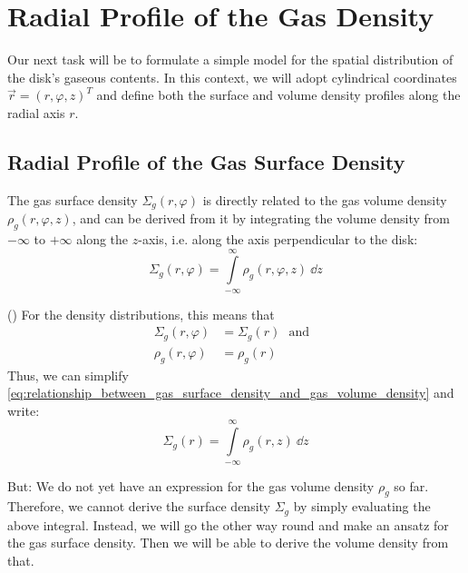 \clearpage\section{Radial Profile of the Gas Density}

    Our next task will be to formulate a simple model for the spatial distribution of the disk's 
    gaseous contents. In this context, we will adopt cylindrical coordinates 
    $\vec r=(r, \varphi, z)^T$ and define both the surface and volume density profiles along the 
    radial axis $r$.

    \subsection{Radial Profile of the Gas Surface Density}

        The gas surface density $\Sigma_g(r,\varphi)$ is directly related to the gas volume density
        $\rho_g(r,\varphi,z)$, and can be derived from it by integrating the volume density from 
        $-\infty$ to $+\infty$ along the $z$-axis, i.e. along the axis perpendicular to the disk:
        \begin{equation}
            \label{eq:relationship_between_gas_surface_density_and_gas_volume_density}
            \Sigma_g(r,\varphi)
                = \int\limits_{-\infty}^{\infty} \rho_g(r,\varphi,z)\ \dd z
        \end{equation}

         ()
        For the density distributions, this means that
        \begin{align}
            \Sigma_g(r, \varphi) 
                &= \Sigma_g(r) 
            \ \ \ \text{and}\ \ \
            \\
            \rho_g(r, \varphi) 
                &= \rho_g(r)
        \end{align}
        Thus, we can simplify 
        \cref{eq:relationship_between_gas_surface_density_and_gas_volume_density} and write:
        \begin{equation}
            \Sigma_g(r)
                = \int\limits_{-\infty}^{\infty} \rho_g(r,z)\ \dd z
        \end{equation}
        
        But: We do not yet have an expression for the gas volume density $\rho_g$ so far.
        Therefore, we cannot derive the surface density $\Sigma_g$ by simply evaluating the above
        integral. Instead, we will go the other way round and make an ansatz for the gas surface
        density. Then we will be able to derive the volume density from that. \\

